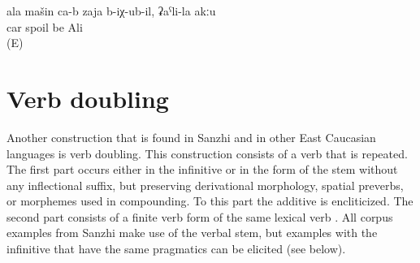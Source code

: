 \begin{exe}
	\ex	\label{ex:It is your car that is spoiled, not Ali's}
	\gll	ala mašin ca-b	zaja	b-iχ-ub-il,	ʡaˁli-la	akːu\\
			car		spoil	be Ali	\\
	\glt	{} (E)
\end{exe}


\section{Verb doubling}
\label{sec:Verb doubling}

Another construction that is found in Sanzhi and in other East Caucasian languages is verb doubling. This construction consists of a verb that is repeated. The first part occurs either in the infinitive or in the form of the stem without any inflectional suffix, but preserving derivational morphology, spatial preverbs, or morphemes used in compounding. To this part the additive  is encliticized. The second part consists of a finite verb form of the same lexical verb . All corpus examples from Sanzhi make use of the verbal stem, but examples with the infinitive that have the same pragmatics can be elicited (see below).
%
